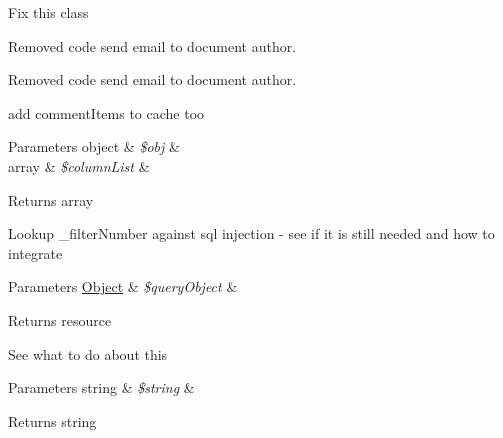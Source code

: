 
\begin{DoxyRefList}
\item[\label{todo__todo000003}%
\hypertarget{todo__todo000003}{}%
Namespace \hyperlink{namespaceclasses}{classes} ]Fix this class  
\item[\label{todo__todo000004}%
\hypertarget{todo__todo000004}{}%
Member \hyperlink{classcommentAdminController_a70bde7bc9124b72df7bdf6bf09633148}{comment\+Admin\+Controller\+:\+:proc\+Comment\+Admin\+Change\+Status} ()]Removed code send email to document author.  
\item[\label{todo__todo000005}%
\hypertarget{todo__todo000005}{}%
Member \hyperlink{classcommentController_a36736562b092a021301ec11a61310e68}{comment\+Controller\+:\+:send\+Email\+To\+Admin\+After\+Insert\+Comment} (\$obj)]Removed code send email to document author.  
\item[\label{todo__todo000006}%
\hypertarget{todo__todo000006}{}%
Member \hyperlink{classcommentModel_a89492b8f475e42296e1560b8886bdc01}{comment\+Model\+:\+:get\+Newest\+Comment\+List} (\$obj, \$column\+List=array())]add comment\+Items to cache too 
\begin{DoxyParams}[1]{Parameters}
object & {\em \$obj} & \\
\hline
array & {\em \$column\+List} & \\
\hline
\end{DoxyParams}
\begin{DoxyReturn}{Returns}
array  
\end{DoxyReturn}

\item[\label{todo__todo000002}%
\hypertarget{todo__todo000002}{}%
Member \hyperlink{classDBMssql_aa3f04ce5bee8d9e11db7de7293055fef}{D\+B\+Mssql\+:\+:\+\_\+execute\+Insert\+Act} (\$query\+Object)]Lookup \+\_\+filter\+Number against sql injection -\/ see if it is still needed and how to integrate 
\begin{DoxyParams}[1]{Parameters}
\hyperlink{classObject}{Object} & {\em \$query\+Object} & \\
\hline
\end{DoxyParams}
\begin{DoxyReturn}{Returns}
resource  
\end{DoxyReturn}

\item[\label{todo__todo000001}%
\hypertarget{todo__todo000001}{}%
Member \hyperlink{classDBMssql_ac380f1918abd17fd5cba28accfaec9fc}{D\+B\+Mssql\+:\+:add\+Quotes} (\$string)]See what to do about this 
\begin{DoxyParams}[1]{Parameters}
string & {\em \$string} & \\
\hline
\end{DoxyParams}
\begin{DoxyReturn}{Returns}
string 
\end{DoxyReturn}

\end{DoxyRefList}